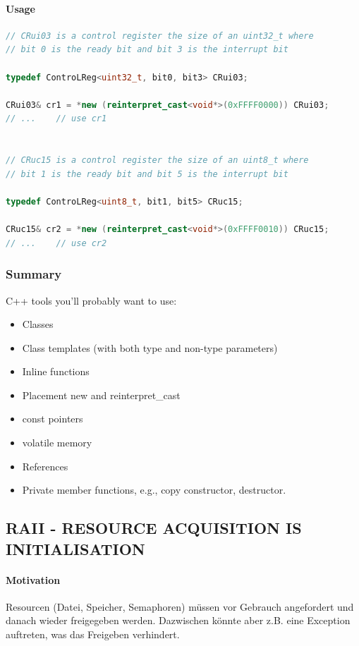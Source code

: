 \paragraph{Usage}
\begin{lstlisting}[language=C++]
// CRui03 is a control register the size of an uint32_t where
// bit 0 is the ready bit and bit 3 is the interrupt bit

typedef ControLReg<uint32_t, bit0, bit3> CRui03;

CRui03& cr1 = *new (reinterpret_cast<void*>(0xFFFF0000)) CRui03;
// ...    // use cr1


// CRuc15 is a control register the size of an uint8_t where
// bit 1 is the ready bit and bit 5 is the interrupt bit

typedef ControLReg<uint8_t, bit1, bit5> CRuc15;

CRuc15& cr2 = *new (reinterpret_cast<void*>(0xFFFF0010)) CRuc15;
// ...    // use cr2
\end{lstlisting}

\subsubsection{Summary}
C++ tools you'll probably want to use:
\begin{itemize}
  \item Classes
  \item Class templates (with both type and non-type parameters)
  \item Inline functions
  \item Placement new and reinterpret\_cast
  \item const pointers
  \item volatile memory
  \item References
  \item Private member functions, e.g., copy constructor, destructor.
\end{itemize}


\subsection[RAII]{RAII - RESOURCE ACQUISITION IS INITIALISATION}

\paragraph{Motivation}
Resourcen (Datei, Speicher, Semaphoren) müssen vor Gebrauch angefordert und danach wieder freigegeben werden.
Dazwischen könnte aber z.B. eine Exception auftreten, was das Freigeben verhindert.


